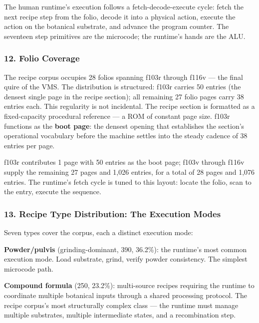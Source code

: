 \documentclass[12pt,a4paper]{article}
\begin{document}
The human runtime's execution follows a fetch-decode-execute cycle:
fetch the next recipe step from the folio, decode it into a physical
action, execute the action on the botanical substrate, and advance the
program counter. The seventeen step primitives are the microcode; the
runtime's hands are the ALU.

\hypertarget{folio-coverage}{%
\subsubsection{12. Folio Coverage}\label{folio-coverage}}

The recipe corpus occupies 28 folios spanning f103r through f116v ---
the final quire of the VMS. The distribution is structured: f103r
carries 50 entries (the densest single page in the recipe section); all
remaining 27 folio pages carry 38 entries each. This regularity is not
incidental. The recipe section is formatted as a fixed-capacity
procedural reference --- a ROM of constant page size. f103r functions as
the \textbf{boot page}: the densest opening that establishes the
section's operational vocabulary before the machine settles into the
steady cadence of 38 entries per page.

f103r contributes 1 page with 50 entries as the boot page; f103v through
f116v supply the remaining 27 pages and 1,026 entries, for a total of 28
pages and 1,076 entries. The runtime's fetch cycle is tuned to this
layout: locate the folio, scan to the entry, execute the sequence.

\hypertarget{recipe-type-distribution-the-execution-modes}{%
\subsubsection{13. Recipe Type Distribution: The Execution
Modes}\label{recipe-type-distribution-the-execution-modes}}

Seven types cover the corpus, each a distinct execution mode:

\textbf{Powder/pulvis} (grinding-dominant, 390, 36.2\%): the runtime's
most common execution mode. Load substrate, grind, verify powder
consistency. The simplest microcode path.

\textbf{Compound formula} (250, 23.2\%): multi-source recipes requiring
the runtime to coordinate multiple botanical inputs through a shared
processing protocol. The recipe corpus's most structurally complex class
--- the runtime must manage multiple substrates, multiple intermediate
states, and a recombination step.
\end{document}
